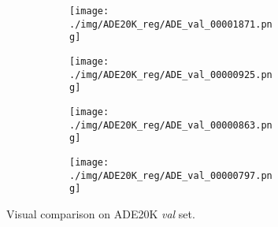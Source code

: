 \documentclass[10pt,twocolumn,letterpaper]{article}
\begin{document}
\begin{figure}
\begin{subfigure}[t]{0.11\textwidth}
        \begin{subfigure}[t]{\textwidth}
                \texttt{[image: ./img/ADE20K\_reg/ADE\_val\_00001871.png]}
            \end{subfigure}\vspace{.1ex}

        \begin{subfigure}[t]{\textwidth}
                \texttt{[image: ./img/ADE20K\_reg/ADE\_val\_00000925.png]}
            \end{subfigure}\vspace{.1ex}

\begin{subfigure}[t]{\textwidth}
                \texttt{[image: ./img/ADE20K\_reg/ADE\_val\_00000863.png]}
            \end{subfigure}\vspace{.1ex}

            \begin{subfigure}[t]{\textwidth}
                \texttt{[image: ./img/ADE20K\_reg/ADE\_val\_00000797.png]}
 \captionsetup{justification=centering}            
        \label{e}
            \end{subfigure}
    \end{subfigure}
        \caption{Visual comparison on ADE20K \textit{val} set.}
\label{cmp2}
\end{figure}
\end{document}
